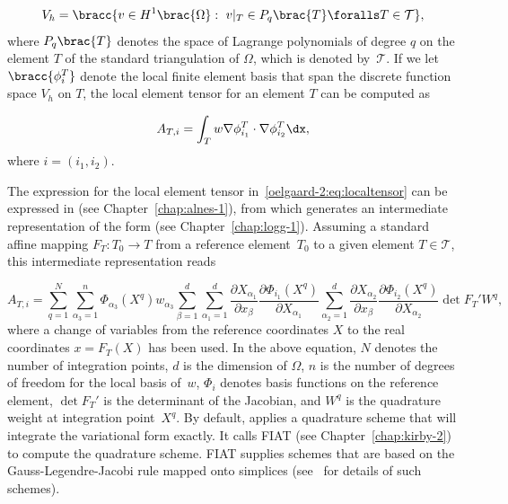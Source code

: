 \begin{equation}
  V_{h} = \bracc{v \in H^{1}\brac{\Omega}: \ v\vert_T \in P_{q}\brac{T}
    \foralls T \in \mathcal{T}},
  \label{oelgaard-2:eq:space_H1}
\end{equation}
%
where $P_{q}\brac{T}$ denotes the space of Lagrange
polynomials of degree $q$ on the element $T$ of the standard
triangulation of $\Omega$, which is denoted by~$\mathcal{T}$.  If we
let $\bracc{\phi^{T}_{i}}$ denote the local finite element basis that
span the discrete function space $V_{h}$ on $T$, the local element
tensor for an element $T$ can be computed as

\begin{equation}
  A_{T,i} = \int_{T} w \nabla \phi^{T}_{i_1} \cdot \nabla
  \phi^{T}_{i_2} \dx,
  \label{oelgaard-2:eq:localtensor}
\end{equation}
%
where $i = (i_{1}, i_{2})$.

The expression for the local element tensor
in~\eqref{oelgaard-2:eq:localtensor} can be expressed in \ufl{} (see
Chapter~\ref{chap:alnes-1}), from which \ffc{} generates an
intermediate representation of the form (see
Chapter~\ref{chap:logg-1}).  Assuming a standard affine mapping $F_T :
T_0 \rightarrow T$ from a reference element~$T_{0}$ to a given element
$T \in \mathcal{T}$, this intermediate representation reads

\begin{equation}
  A_{T,i}
  =
  \sum_{q=1}^{N}
  \sum_{\alpha_{3}=1}^n
  \Phi_{\alpha_{3}}(X^q)
  w_{\alpha_{3}}
  \sum_{\beta=1}^d
  \sum_{\alpha_1=1}^d
  \frac{\partial X_{\alpha_1}}{\partial x_{\beta}}
  \frac{\partial \Phi_{i_1}(X^q)}{\partial X_{\alpha_1}}
  \sum_{\alpha_2=1}^d
  \frac{\partial X_{\alpha_2}}{\partial x_{\beta}}
  \frac{\partial \Phi_{i_2}(X^q)}{\partial X_{\alpha_2}}
  \det F_T'
  W^q,
\label{oelgaard-2:eq:weightedlaplacian_quadraturerepresentation}
\end{equation}
%
where a change of variables from the reference coordinates
$X$ to the real coordinates $x = F_T(X)$ has been used. In the above
equation, $N$ denotes the number of integration points, $d$ is the
dimension of $\Omega$, $n$ is the number of degrees of freedom for the
local basis of~$w$, $\Phi_{i}$ denotes basis functions on the
reference element, $\det F_T'$ is the determinant of the Jacobian, and
$W^q$ is the quadrature weight at integration point~$X^q$.  By
default, \ffc{} applies a quadrature scheme that will integrate the
variational form exactly.  It calls FIAT (see
Chapter~\ref{chap:kirby-2}) to compute the quadrature scheme.  FIAT
supplies schemes that are based on the Gauss-Legendre-Jacobi rule
mapped onto simplices (see~\citet{KarniadakisSherwin2005} for details
of such schemes).

